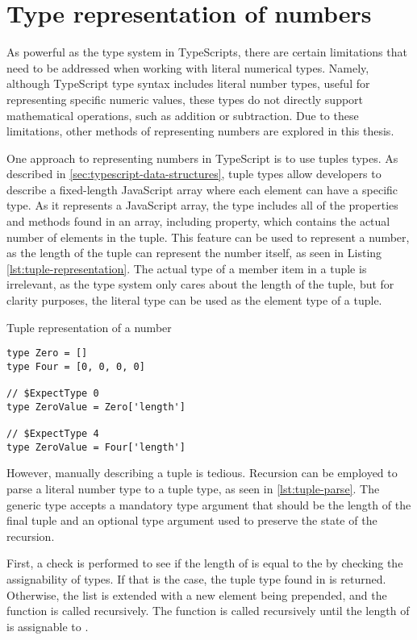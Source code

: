 \section{Type representation of numbers}

As powerful as the type system in TypeScripts, there are certain limitations that need to be addressed when working with literal numerical types. Namely, although TypeScript type syntax includes literal number types, useful for representing specific numeric values, these types do not directly support mathematical operations, such as addition or subtraction. Due to these limitations, other methods of representing numbers are explored in this thesis.

One approach to representing numbers in TypeScript is to use tuples types. As described in \ref{sec:typescript-data-structures}, tuple types allow developers to describe a fixed-length JavaScript array where each element can have a specific type. As it represents a JavaScript array, the type includes all of the properties and methods found in an array, including  property, which contains the actual number of elements in the tuple. This feature can be used to represent a number, as the length of the tuple can represent the number itself, as seen in Listing \ref{lst:tuple-representation}. The actual type of a member item in a tuple is irrelevant, as the type system only cares about the length of the tuple, but for clarity purposes, the literal type  can be used as the element type of a tuple.

\begin{listing}[ht]
  \caption{Tuple representation of a number}\label{lst:tuple-representation}
  \begin{verbatim}
type Zero = []
type Four = [0, 0, 0, 0] 

// $ExpectType 0
type ZeroValue = Zero['length']

// $ExpectType 4
type ZeroValue = Four['length']
\end{verbatim}
\end{listing}

However, manually describing a tuple is tedious. Recursion can be employed to parse a literal number type to a tuple type, as seen in \ref{lst:tuple-parse}. The  generic type accepts a mandatory type argument  that should be the length of the final tuple and an optional type argument  used to preserve the state of the recursion.

First, a check is performed to see if the length of  is equal to the  by checking the assignability of types. If that is the case, the tuple type found in  is returned. Otherwise, the list is extended with a new  element being prepended, and the function is called recursively. The function is called recursively until the length of  is assignable to .

